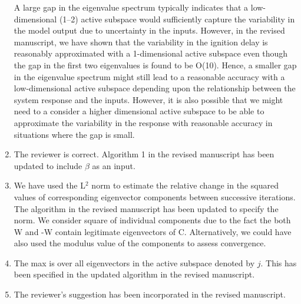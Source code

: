 \documentclass[11pt,final]{article}
\newcommand{\referee}[1]{\vspace{.1ex}\noindent{\textcolor{blue}{#1}}}
\begin{document}
\begin{enumerate}[wide, labelwidth=!, labelindent=0pt]
A large gap in the eigenvalue spectrum typically indicates that a low-dimensional (1--2) active subspace 
would sufficiently capture the variability in the model output due to uncertainty in the inputs. However,
in the revised manuscript, we have shown that the variability in the ignition delay is reasonably
approximated with a 1-dimensional active subspace even though the gap in the first two eigenvalues
is found to be O(10). Hence, a smaller gap in the eigenvalue spectrum might still lead to a reasonable
accuracy with a low-dimensional active subspace depending upon the relationship between the
system response and the inputs. However, it is also possible that we might need to a consider a higher 
dimensional active subspace to be able to approximate the variability in the response with reasonable
accuracy in situations where the gap is small. 

\item \referee{11.33: Alg. 1: should have $\beta$ as input, too?}

The reviewer is correct. Algorithm 1 in the revised manuscript has been updated to include $\beta$
as an input. 

\item \referee{11.42: Which norm is used? Any intuition why squares of W are used, and not just W?}

We have used the L$^2$ norm to estimate the relative change in the squared values of corresponding
eigenvector components between successive iterations. The algorithm in the revised manuscript has been updated 
to specify the norm. 
We consider square of individual components due to the fact the both W and -W contain legitimate eigenvectors 
of C. Alternatively, we could have also used the modulus value of the components to assess convergence. 

\item \referee{11.45: what is max over?}

The max is over all eigenvectors in the active subspace denoted by $j$. This has been specified in
the updated algorithm in the revised manuscript.

\item \referee{12.29: 'higher-order' should be replaced with higher-index or smaller-magnitude, to avoid confusion.}

The reviewer's suggestion has been incorporated in the revised manuscript.


\end{enumerate}
\end{document}
